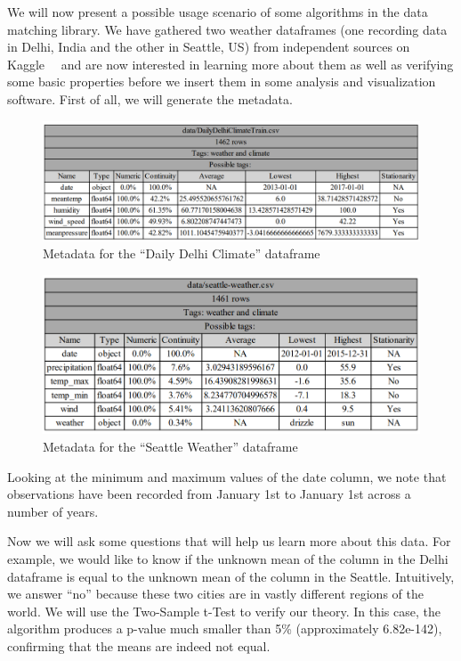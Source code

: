 We will now present a possible usage scenario of some algorithms in the data matching library.
We have gathered two weather dataframes (one recording data in Delhi, India and the other in Seattle, US) from independent
sources on Kaggle~~\cite{kaggleDailyDelhiClimate,kaggleSeattleWeather} and are now interested in learning more about them
as well as verifying some basic properties before we insert them in some analysis and visualization software.
First of all, we will generate the metadata.

\begin{figure}[h]
    \centering
    \includegraphics[width=12cm]{figures/matching_weather_data/daily_delhi_climate}
    \caption{Metadata for the ``Daily Delhi Climate'' dataframe}
    \label{fig:daily_delhi_climate}
\end{figure}

\begin{figure}[h]
    \centering
    \includegraphics[width=12cm]{figures/matching_weather_data/seattle_weather}
    \caption{Metadata for the ``Seattle Weather'' dataframe}
    \label{fig:seattle_weather}
\end{figure}

Looking at the minimum and maximum values of the date column, we note that observations have been recorded from January 1st
to January 1st across a number of years.

Now we will ask some questions that will help us learn more about this data.
For example, we would like to know if the unknown mean of the column  in the Delhi dataframe is equal to the
unknown mean of the column  in the Seattle.
Intuitively, we answer ``no'' because these two cities are in vastly different regions of the world.
We will use the Two-Sample t-Test to verify our theory.
In this case, the algorithm produces a p-value much smaller than 5\% (approximately 6.82e-142), confirming that the means
are indeed not equal.

